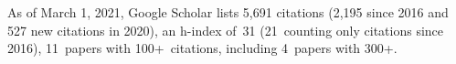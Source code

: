 %
As of March 1, 2021, Google Scholar lists
5,691 citations (2,195 since 2016 and 527 new citations in 2020),
an h-index of~31 (21~counting only citations since 2016),
11~papers with 100+~citations, including 4~papers with 300+.
